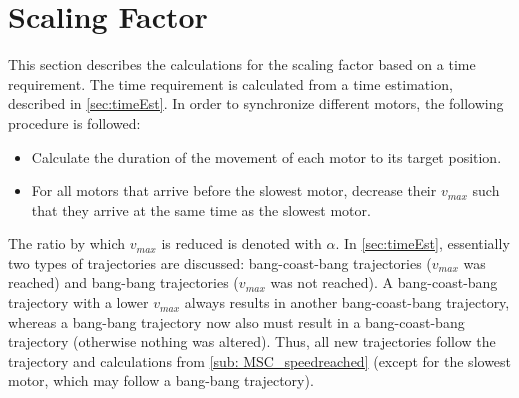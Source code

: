 \section{Scaling Factor}
\label{sec:scalingFactor}
This section describes the calculations for the scaling factor based on a time requirement. The time requirement is calculated from a time estimation, described in \cref{sec:timeEst}. In order to synchronize different motors, the following procedure is followed:

\begin{itemize}
    \item Calculate the duration of the movement of each motor to its target position.
    \item For all motors that arrive before the slowest motor, decrease their $v_{max}$ such that they arrive at the same time as the slowest motor.
\end{itemize}

\noindent The ratio by which $v_{max}$ is reduced is denoted with $\alpha$. In \cref{sec:timeEst}, essentially two types of trajectories are discussed: bang-coast-bang trajectories ($v_{max}$ was reached) and bang-bang trajectories ($v_{max}$ was not reached). A bang-coast-bang trajectory with a lower $v_{max}$ always results in another bang-coast-bang trajectory, whereas a bang-bang trajectory now also must result in a bang-coast-bang trajectory (otherwise nothing was altered). Thus, all new trajectories follow the trajectory and calculations from \cref{sub: MSC_speedreached} (except for the slowest motor, which may follow a bang-bang trajectory). 


